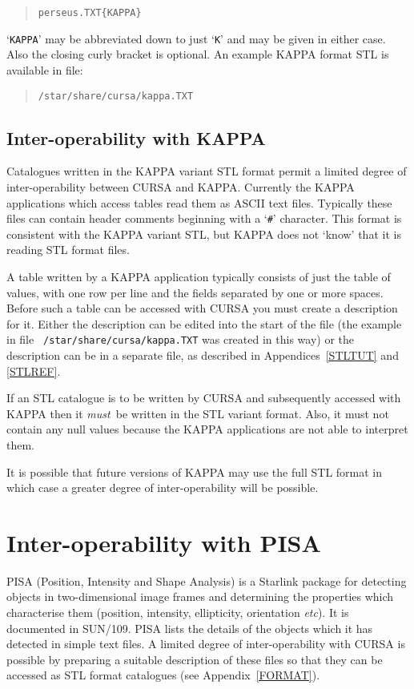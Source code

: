 \documentclass[twoside,11pt]{article}
\newcommand{\xref}[3]{#1}
\newcommand{\xlabel}[1]{}
\renewcommand{\_}{\texttt{\symbol{95}}}
\begin{document}
\begin{verse}
{\tt perseus.TXT\{KAPPA\}}
\end{verse}

`{\tt KAPPA}' may be abbreviated down to just `{\tt K}' and may be given
in either case.  Also the closing curly bracket is optional.  An example
KAPPA format STL is available in file:

\begin{verse}
{\tt /star/share/cursa/kappa.TXT}
\end{verse}

\subsection{Inter-operability with KAPPA}

Catalogues written in the KAPPA variant STL format permit a limited
degree of inter-operability between CURSA and KAPPA.  Currently the
KAPPA applications which access tables read them as ASCII text files.
Typically these files can contain header comments beginning with a 
`{\tt \#}' character.  This format is consistent with the KAPPA variant
STL, but KAPPA does not `know' that it is reading STL format files.

A table written by a KAPPA application typically consists of just the
table of values, with one row per line and the fields separated by one
or more spaces.  Before such a table can be accessed with CURSA you must
create a description for it.  Either the description can be edited into
the start of the file (the example in file {\tt
/star/share/cursa/kappa.TXT} was created in this way) or the
description can be in a separate file, as described in
Appendices~\ref{STLTUT} and \ref{STLREF}.

If an STL catalogue is to be written by CURSA and subsequently accessed
with KAPPA then it {\it must}\, be written in the STL variant format.
Also, it must not contain any null values because the KAPPA applications
are not able to interpret them.

It is possible that future versions of KAPPA may use the full STL format
in which case a greater degree of inter-operability will be possible.


\section{\xlabel{PISA}\label{PISA}Inter-operability with PISA}

PISA (Position, Intensity and Shape Analysis) is a Starlink package for
detecting objects in two-dimensional image frames and determining
the properties which characterise them (position, intensity, ellipticity,
orientation \emph{etc}\/).  It is documented in
\xref{SUN/109}{sun109}{}\cite{SUN109}.  PISA lists the details of the
objects which it has detected in simple text files.  A limited degree of
inter-operability with CURSA is possible by preparing a suitable description
of these files so that they can be accessed as STL format catalogues (see
Appendix~\ref{FORMAT}).
\end{document}
